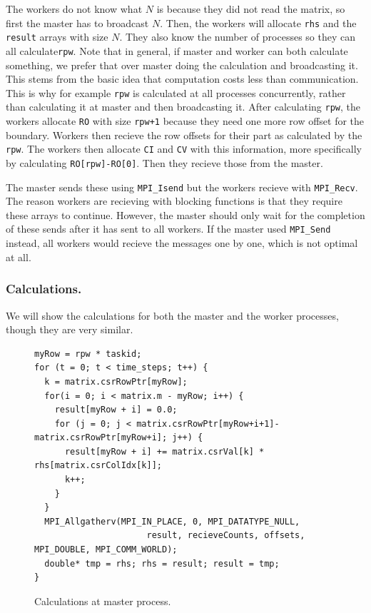 \documentclass[12pt,reqno]{amsart}
\newcommand{\code}[1]{\texttt{#1}}
\begin{document}
The workers do not know what $N$ is because they did not read the matrix, so first the master has to broadcast $N$. Then, the workers will allocate \code{rhs} and the \code{result} arrays with size $N$. They also know the number of processes so they can all calculate\code{rpw}. Note that in general, if master and worker can both calculate something, we prefer that over master doing the calculation and broadcasting it. This stems from the basic idea that computation costs less than communication. This is why for example \code{rpw} is calculated at all processes concurrently, rather than calculating it at master and then broadcasting it. After calculating \code{rpw}, the workers allocate \code{RO} with size \code{rpw+1} because they need one more row offset for the boundary. Workers then recieve the row offsets for their part as calculated by the \code{rpw}. The workers then allocate \code{CI} and \code{CV} with this information, more specifically by calculating \code{RO[rpw]-RO[0]}. Then they recieve those from the master.

The master sends these using \code{MPI\_Isend} but the workers recieve with \code{MPI\_Recv}. The reason workers are recieving with blocking functions is that they require these arrays to continue. However, the master should only wait for the completion of these sends after it has sent to all workers. If the master used \code{MPI\_Send} instead, all workers would recieve the messages one by one, which is not optimal at all.

\subsubsection{Calculations.}
We will show the calculations for both the master and the worker processes, though they are very similar.
\begin{figure}[h]
\centering
\begin{lstlisting}
myRow = rpw * taskid;
for (t = 0; t < time_steps; t++) {
  k = matrix.csrRowPtr[myRow];
  for(i = 0; i < matrix.m - myRow; i++) { 
    result[myRow + i] = 0.0;
    for (j = 0; j < matrix.csrRowPtr[myRow+i+1]-matrix.csrRowPtr[myRow+i]; j++) {
      result[myRow + i] += matrix.csrVal[k] * rhs[matrix.csrColIdx[k]];
      k++;
    }
  }
  MPI_Allgatherv(MPI_IN_PLACE, 0, MPI_DATATYPE_NULL,
                      result, recieveCounts, offsets, MPI_DOUBLE, MPI_COMM_WORLD);
  double* tmp = rhs; rhs = result; result = tmp; 
}
\end{lstlisting}
\caption{Calculations at master process.}
\label{fig:calc_master}
\end{figure}
\end{document}
